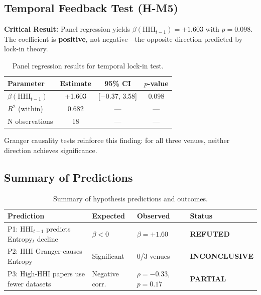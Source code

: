 \subsection{Temporal Feedback Test (H-M5)}

\textbf{Critical Result:} Panel regression yields $\beta(\text{HHI}_{t-1}) = +1.603$ with $p = 0.098$. The coefficient is \textbf{positive}, not negative---the opposite direction predicted by lock-in theory.

\begin{table}[htbp]
\centering
\caption{Panel regression results for temporal lock-in test.}
\label{tab:panel}
\begin{tabular}{@{}lccc@{}}
\toprule
Parameter & Estimate & 95\% CI & $p$-value \\
\midrule
$\beta(\text{HHI}_{t-1})$ & +1.603 & [$-$0.37, 3.58] & 0.098 \\
$R^2$ (within) & 0.682 & --- & --- \\
N observations & 18 & --- & --- \\
\bottomrule
\end{tabular}
\end{table}

Granger causality tests reinforce this finding: for all three venues, neither direction achieves significance.

\subsection{Summary of Predictions}

\begin{table}[htbp]
\centering
\caption{Summary of hypothesis predictions and outcomes.}
\label{tab:predictions}
\begin{tabular}{@{}llll@{}}
\toprule
Prediction & Expected & Observed & Status \\
\midrule
P1: $\text{HHI}_{t-1}$ predicts Entropy$_t$ decline & $\beta < 0$ & $\beta = +1.60$ & \textbf{REFUTED} \\
P2: HHI Granger-causes Entropy & Significant & 0/3 venues & \textbf{INCONCLUSIVE} \\
P3: High-HHI papers use fewer datasets & Negative corr. & $\rho = -0.33$, $p = 0.17$ & \textbf{PARTIAL} \\
\bottomrule
\end{tabular}
\end{table}
